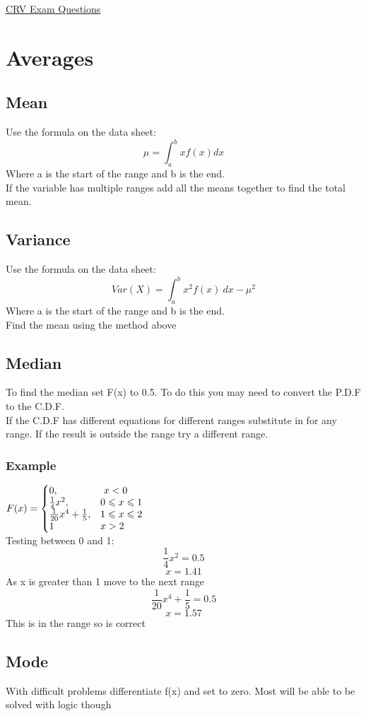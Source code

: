 \documentclass{article}[18pt]
\begin{document}
\begin{center}
\underline{\huge CRV Exam Questions}
\end{center}
\section{Averages}
\subsection{Mean}
Use the formula on the data sheet:
$$\mu=\int_a^bxf(x) dx$$
Where a is the start of the range and b is the end.\\
If the variable has multiple ranges add all the means together to find the total mean.
\subsection{Variance}
Use the formula on the data sheet:
$$Var(X)=\int_a^b x^2f(x) \ dx-\mu^2$$
Where a is the start of the range and b is the end.\\
Find the mean using the method above


\subsection{Median}
To find the median set F(x) to 0.5. To do this you may need to convert the P.D.F to the C.D.F.\\
If the C.D.F has different equations for different ranges substitute in for any range. If the result is outside the range try a different range.
\subsubsection{Example}
{\renewcommand{\arraystretch}{1.5}
$
  F(x)=\left\{
  \begin{array}{@{}ll@{}}
    0, & \ x<0\\
    \frac{1}{4}x^2, &  0\leqslant x \leqslant 1\\
    \frac{1}{20}x^4+\frac{1}{5}, &  1\leqslant x \leqslant 2\\
    1 & x>2
  \end{array}\right.
$}\\
Testing between 0 and 1:
$$\frac{1}{4}x^2=0.5$$
$$x=1.41$$
As x is greater than 1 move to the next range
$$\frac{1}{20}x^4+\frac{1}{5}=0.5$$
$$x=1.57$$
This is in the range so is correct
\subsection{Mode}
With difficult problems differentiate f(x) and set to zero. Most will be able to be solved with logic though
\newpage
\end{document}
